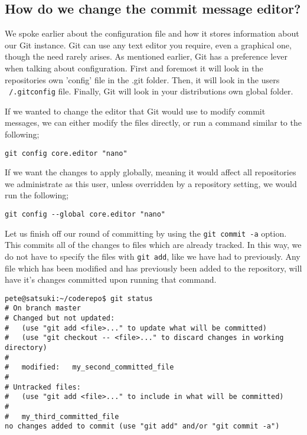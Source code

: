 \subsection*{How do we change the commit message editor?}

We spoke earlier about the configuration file and how it stores information about our Git instance.  Git can use any text editor you require, even a graphical one, though the need rarely arises.  As mentioned earlier, Git has a preference lever when talking about configuration.  First and foremost it will look in the repositories own 'config' file in the .git folder.  Then, it will look in the users \texttt{~/.gitconfig} file.  Finally, Git will look in your distributions own global folder.  

If we wanted to change the editor that Git would use to modify commit messages, we can either modify the files directly, or run a command similar to the following;

\begin{verbatim} 
git config core.editor "nano"
\end{verbatim}

If we want the changes to apply globally, meaning it would affect all repositories we administrate as this user, unless overridden by a repository setting, we would run the following;

\begin{verbatim} 
git config --global core.editor "nano"
\end{verbatim}

Let us finish off our round of committing by using the \texttt{git commit -a} option.  This commits all of the changes to files which are already tracked.  In this way, we do not have to specify the files with \texttt{git add}, like we have had to previously.  Any file which has been modified and has previously been added to the repository, will have it's changes committed upon running that command.

\begin{verbatim} 
pete@satsuki:~/coderepo$ git status 
# On branch master 
# Changed but not updated: 
#   (use "git add <file>..." to update what will be committed) 
#   (use "git checkout -- <file>..." to discard changes in working directory) 
# 
#	modified:   my_second_committed_file 
# 
# Untracked files: 
#   (use "git add <file>..." to include in what will be committed) 
# 
#	my_third_committed_file 
no changes added to commit (use "git add" and/or "git commit -a")
\end{verbatim} 

